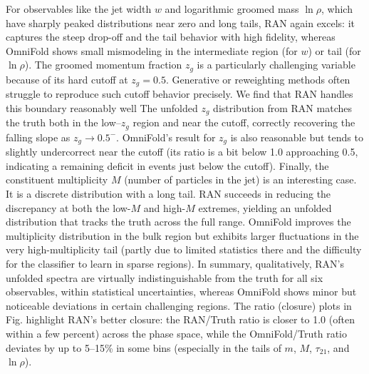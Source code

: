             For observables like the jet width $w$ and logarithmic groomed mass $\ln\rho$, which have sharply peaked distributions near zero and long tails, RAN again excels: it captures the steep drop-off and the tail behavior with high fidelity, whereas OmniFold shows small mismodeling in the intermediate region (for $w$) or tail (for $\ln\rho$).
            The groomed momentum fraction $z_g$ is a particularly challenging variable because of its hard cutoff at $z_g=0.5$.
            Generative or reweighting methods often struggle to reproduce such cutoff behavior precisely.
            We find that RAN handles this boundary reasonably well
            The unfolded $z_g$ distribution from RAN matches the truth both in the low--$z_g$ region and near the cutoff, correctly recovering the falling slope as $z_g \to 0.5^-$.
            OmniFold’s result for $z_g$ is also reasonable but tends to slightly undercorrect near the cutoff (its ratio is a bit below 1.0 approaching 0.5, indicating a remaining deficit in events just below the cutoff).
            Finally, the constituent multiplicity $M$ (number of particles in the jet) is an interesting case.
            It is a discrete distribution with a long tail.
            RAN succeeds in reducing the discrepancy at both the low-$M$ and high-$M$ extremes, yielding an unfolded distribution that tracks the truth across the full range.
            OmniFold improves the multiplicity distribution in the bulk region but exhibits larger fluctuations in the very high-multiplicity tail (partly due to limited statistics there and the difficulty for the classifier to learn in sparse regions).
            In summary, qualitatively, RAN’s unfolded spectra are virtually indistinguishable from the truth for all six observables, within statistical uncertainties, whereas OmniFold shows minor but noticeable deviations in certain challenging regions.
            The ratio (closure) plots in Fig. highlight RAN’s better closure: the RAN/Truth ratio is closer to 1.0 (often within a few percent) across the phase space, while the OmniFold/Truth ratio deviates by up to 5–15\% in some bins (especially in the tails of $m$, $M$, $\tau_{21}$, and $\ln\rho$).

